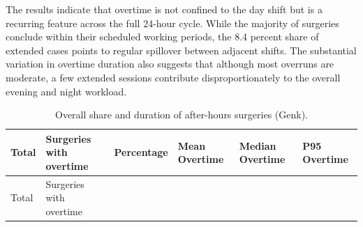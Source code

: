\documentclass[
]{article}
\begin{document}
The results indicate that overtime is not confined to the day shift but
is a recurring feature across the full 24-hour cycle. While the majority
of surgeries conclude within their scheduled working periods, the 8.4
percent share of extended cases points to regular spillover between
adjacent shifts. The substantial variation in overtime duration also
suggests that although most overruns are moderate, a few extended
sessions contribute disproportionately to the overall evening and night
workload.

\begin{longtable}[]{@{}
  >{\centering\arraybackslash}p{}
  >{\centering\arraybackslash}p{}
  >{\centering\arraybackslash}p{}
  >{\centering\arraybackslash}p{}
  >{\centering\arraybackslash}p{}
  >{\centering\arraybackslash}p{}@{}}
\caption{Overall share and duration of after-hours surgeries (Genk).
\label{tab:overtime_summary}}\tabularnewline
\toprule\noalign{}
\begin{minipage}[b]{\linewidth}\centering
Total
\end{minipage} & \begin{minipage}[b]{\linewidth}\centering
Surgeries with overtime
\end{minipage} & \begin{minipage}[b]{\linewidth}\centering
Percentage
\end{minipage} & \begin{minipage}[b]{\linewidth}\centering
Mean Overtime
\end{minipage} & \begin{minipage}[b]{\linewidth}\centering
Median Overtime
\end{minipage} & \begin{minipage}[b]{\linewidth}\centering
P95 Overtime
\end{minipage} \\
\midrule\noalign{}
\endfirsthead
\toprule\noalign{}
\begin{minipage}[b]{\linewidth}\centering
Total
\end{minipage} & \begin{minipage}[b]{\linewidth}\centering
Surgeries with overtime
\end{minipage} & \begin{minipage}[b]{\linewidth}\centering

\end{minipage}
\end{longtable}
\end{document}
